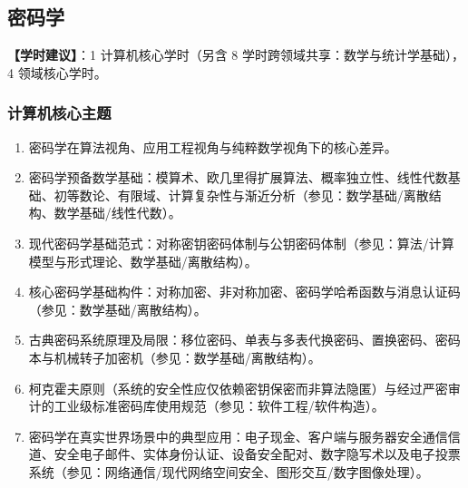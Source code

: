 \subsection{密码学}
\textbf{【学时建议】}：1 计算机核心学时（另含 8 学时跨领域共享：数学与统计学基础），4 领域核心学时。

\subsubsection{计算机核心主题}
\begin{enumerate}\setlength{\itemsep}{0pt}\setlength{\parskip}{0pt}
    \item 密码学在算法视角、应用工程视角与纯粹数学视角下的核心差异。
    \item 密码学预备数学基础：模算术、欧几里得扩展算法、概率独立性、线性代数基础、初等数论、有限域、计算复杂性与渐近分析（参见：数学基础/离散结构、数学基础/线性代数）。
    \item 现代密码学基础范式：对称密钥密码体制与公钥密码体制（参见：算法/计算模型与形式理论、数学基础/离散结构）。
    \item 核心密码学基础构件：对称加密、非对称加密、密码学哈希函数与消息认证码（参见：数学基础/离散结构）。
    \item 古典密码系统原理及局限：移位密码、单表与多表代换密码、置换密码、密码本与机械转子加密机（参见：数学基础/离散结构）。
    \item 柯克霍夫原则（系统的安全性应仅依赖密钥保密而非算法隐匿）与经过严密审计的工业级标准密码库使用规范（参见：软件工程/软件构造）。
    \item 密码学在真实世界场景中的典型应用：电子现金、客户端与服务器安全通信信道、安全电子邮件、实体身份认证、设备安全配对、数字隐写术以及电子投票系统（参见：网络通信/现代网络空间安全、图形交互/数字图像处理）。
\end{enumerate}

